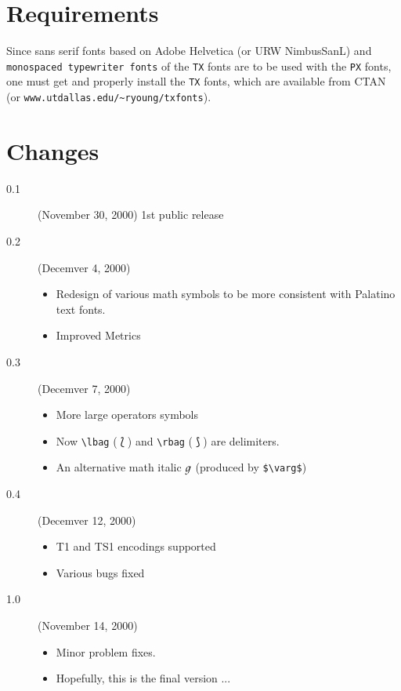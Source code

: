 \documentclass[10pt]{article}
\begin{document}
\section{Requirements}

Since \textsf{sans serif fonts based on Adobe Helvetica (or URW NimbusSanL)}
and \texttt{monospaced typewriter fonts} of the \texttt{TX} fonts are to be
used with the \texttt{PX} fonts, one must get and properly install
the \texttt{TX} fonts, which are available from CTAN
(or \verb|www.utdallas.edu/~ryoung/txfonts|).

\section{Changes}

\begin{description}
\item[0.1] (November 30, 2000) 1st public release
\item[0.2] (Decemver 4, 2000)
    \begin{itemize}
    \item Redesign of various math symbols to be more consistent with Palatino text fonts.
    \item Improved Metrics
    \end{itemize}
\item[0.3] (Decemver 7, 2000)
    \begin{itemize}
    \item More large operators symbols
    \item Now \verb|\lbag| ($\lbag$) and \verb|\rbag| ($\rbag$) are
          delimiters.
    \item An alternative math italic $\varg$ (produced by \verb|$\varg$|)
    \end{itemize}
\item[0.4] (Decemver 12, 2000)
    \begin{itemize}
    \item T1 and TS1 encodings supported
    \item Various bugs fixed
    \end{itemize}
\item[1.0] (November 14, 2000)
     \begin{itemize}
     \item Minor problem fixes.
     \item Hopefully, this is the final version ...
     \end{itemize}
\end{description}
\end{document}
